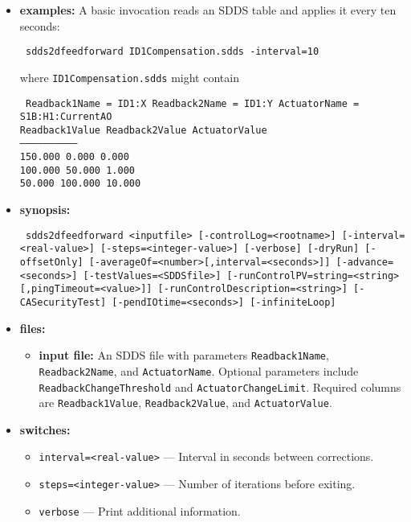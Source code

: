 \begin{itemize}
\item {\bf examples:}
A basic invocation reads an SDDS table and applies it every ten seconds:
\begin{flushleft}{\tt
sdds2dfeedforward ID1Compensation.sdds -interval=10
}\end{flushleft}
where \verb+ID1Compensation.sdds+ might contain
\begin{flushleft}{\tt
Readback1Name = ID1:X \quad Readback2Name = ID1:Y \quad ActuatorName = S1B:H1:CurrentAO\\
 Readback1Value  Readback2Value  ActuatorValue\\
------------------------------\\
       150.000       0.000          0.000\\
       100.000      50.000          1.000\\
        50.000     100.000         10.000\\
}\end{flushleft}
\item {\bf synopsis:}
\begin{flushleft}{\tt
sdds2dfeedforward <inputfile>\
       [-controlLog=<rootname>]\
       [-interval=<real-value>] [-steps=<integer-value>]\
       [-verbose] [-dryRun] [-offsetOnly]\
       [-averageOf=<number>[,interval=<seconds>]]\
       [-advance=<seconds>]\
       [-testValues=<SDDSfile>]\
       [-runControlPV=string=<string>[,pingTimeout=<value>]]\
       [-runControlDescription=<string>]\
       [-CASecurityTest]\
       [-pendIOtime=<seconds>] [-infiniteLoop]
}\end{flushleft}
\item {\bf files:}
\begin{itemize}
  \item {\bf input file:} An SDDS file with parameters \verb+Readback1Name+,
  \verb+Readback2Name+, and \verb+ActuatorName+.  Optional parameters include
  \verb+ReadbackChangeThreshold+ and \verb+ActuatorChangeLimit+.  Required
  columns are \verb+Readback1Value+, \verb+Readback2Value+, and
  \verb+ActuatorValue+.
\end{itemize}
\item {\bf switches:}
    \begin{itemize}
        \item {\tt interval=<real-value>} --- Interval in seconds between corrections.
        \item {\tt steps=<integer-value>} --- Number of iterations before exiting.
        \item {\tt verbose} --- Print additional information.

\end{itemize}
\end{itemize}
